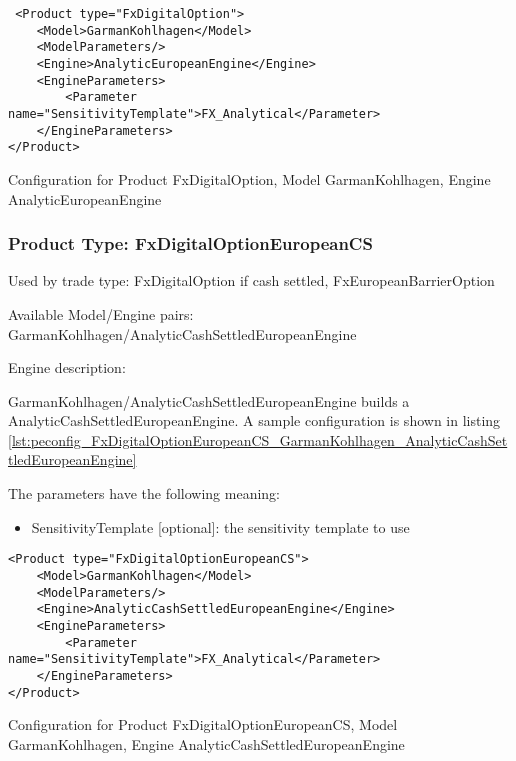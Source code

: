 \begin{longlisting}
\begin{verbatim}
 <Product type="FxDigitalOption">
    <Model>GarmanKohlhagen</Model>
    <ModelParameters/>
    <Engine>AnalyticEuropeanEngine</Engine>
    <EngineParameters>
        <Parameter name="SensitivityTemplate">FX_Analytical</Parameter>
    </EngineParameters>
</Product>
\end{verbatim}
\caption{Configuration for Product FxDigitalOption, Model GarmanKohlhagen, Engine AnalyticEuropeanEngine}
\label{lst:peconfig_FxDigitalOption_GarmanKohlhagen_AnalyticEuropeanEngine}
\end{longlisting}

\subsubsection{Product Type: FxDigitalOptionEuropeanCS}

Used by trade type: FxDigitalOption if cash settled, FxEuropeanBarrierOption

Available Model/Engine pairs: GarmanKohlhagen/AnalyticCashSettledEuropeanEngine

Engine description:

GarmanKohlhagen/AnalyticCashSettledEuropeanEngine builds a AnalyticCashSettledEuropeanEngine. A sample configuration is
shown in listing \ref{lst:peconfig_FxDigitalOptionEuropeanCS_GarmanKohlhagen_AnalyticCashSettledEuropeanEngine}

The parameters have the following meaning:

\begin{itemize}
\item SensitivityTemplate [optional]: the sensitivity template to use 
\end{itemize}

\begin{longlisting}
\begin{verbatim}
<Product type="FxDigitalOptionEuropeanCS">
    <Model>GarmanKohlhagen</Model>
    <ModelParameters/>
    <Engine>AnalyticCashSettledEuropeanEngine</Engine>
    <EngineParameters>
        <Parameter name="SensitivityTemplate">FX_Analytical</Parameter>
    </EngineParameters>
</Product>
\end{verbatim}
\caption{Configuration for Product FxDigitalOptionEuropeanCS, Model GarmanKohlhagen, Engine AnalyticCashSettledEuropeanEngine}
\label{lst:peconfig_FxDigitalOptionEuropeanCS_GarmanKohlhagen_AnalyticCashSettledEuropeanEngine}
\end{longlisting}

